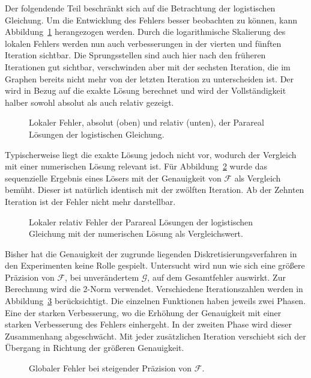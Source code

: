 Der folgendende Teil beschränkt sich auf die Betrachtung der logistischen Gleichung. Um die Entwicklung des Fehlers besser beobachten zu können, kann Abbildung~\ref{fig:iter_error_local} herangezogen werden. Durch die logarithmische Skalierung des lokalen Fehlers werden nun auch verbesserungen in der vierten und fünften Iteration sichtbar. Die Sprungsstellen sind auch hier nach den früheren Iterationen gut sichtbar, verschwinden aber mit der sechsten Iteration, die im Graphen bereits nicht mehr von der letzten Iteration zu unterscheiden ist. Der wird in Bezug auf die exakte Lösung berechnet und wird der Vollständigkeit halber sowohl absolut als auch relativ gezeigt.
\begin{figure}[ht]
    \centering
        
        
    \caption{Lokaler Fehler, absolut (oben) und relativ (unten), der Parareal Lösungen der logistischen Gleichung.}
    \label{fig:iter_error_local}
\end{figure}
Typischerweise liegt die exakte Lösung jedoch nicht vor, wodurch der Vergleich mit einer numerischen Lösung relevant ist. Für Abbildung~\ref{fig:iter_error_local_num} wurde das sequenzielle Ergebnis eines Lösers mit der Genauigkeit von \(\mathcal{F}\) als Vergleich bemüht. Dieser ist natürlich identisch mit der zwölften Iteration. Ab der Zehnten Iteration ist der Fehler nicht mehr darstellbar.\\
\begin{figure}[ht]
    \centering
        
    \caption{Lokaler relativ Fehler der Parareal Lösungen der logistischen Gleichung mit der numerischen Lösung als Vergleichswert.}
    \label{fig:iter_error_local_num}
\end{figure}

Bisher hat die Genauigkeit der zugrunde liegenden Diskretisierungsverfahren in den Experimenten keine Rolle gespielt. Untersucht wird nun wie sich eine größere Präzision von \(\mathcal{F}\), bei unverändertem \(\mathcal{G}\), auf dem Gesamtfehler auswirkt. Zur Berechnung wird die 2-Norm verwendet. Verschiedene Iterationszahlen werden in Abbildung~\ref{fig:iter_error} berücksichtigt. Die einzelnen Funktionen haben jeweils zwei Phasen. Eine der starken Verbesserung, wo die Erhöhung der Genauigkeit mit einer starken Verbesserung des Fehlers einhergeht. In der zweiten Phase wird dieser Zusammenhang abgeschwächt. Mit jeder zusätzlichen Iteration verschiebt sich der Übergang in Richtung der größeren Genauigkeit.
\begin{figure}[ht]
    \centering
        
    \caption{Globaler Fehler bei steigender Präzision von \(\mathcal{F}\).}
    \label{fig:iter_error}
\end{figure}

